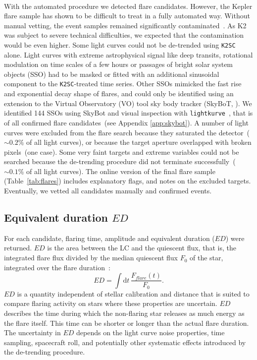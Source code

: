 \documentclass{aa}
\begin{document}
\\
With the automated procedure we detected flare candidates. However, the Kepler flare sample has shown to be difficult to treat in a fully automated way. Without manual vetting, the event samples remained significantly contaminated~\citep{yang2019}. As K2 was subject to severe technical difficulties, we expected that the contamination would be even higher. Some light curves could not be de-trended using \texttt{K2SC} alone. Light curves with extreme astrophysical signal like deep transits, rotational modulation on time scales of a few hours or passages of bright solar system objects (SSO) had to be masked or fitted with an additional sinusoidal component to the \texttt{K2SC}-treated time series. Other SSOs mimicked the fast rise and exponential decay shape of flares, and could only be identified using an extension to the Virtual Observatory (VO) tool sky body tracker (SkyBoT, \citealt{berthier2006, berthier2016}). We identified 144 SSOs using SkyBot and visual inspection with \texttt{lightkurve}~\citep{lightkurve2018}, that is of all confirmed flare candidates~(see Appendix \ref{app:skybot}). A number of light curves were excluded from the flare search because they saturated the detector~($\sim 0.2\%$ of all light curves), or because the target aperture overlapped with broken pixels~(one case). Some very faint targets and extreme variables could not be searched because the de-trending procedure did not terminate successfully~($\sim 0.1\%$ of all light curves). The online version of the final flare sample (Table~\ref{tab:flares}) includes explanatory flags, and notes on the excluded targets. Eventually, we vetted all candidates manually and confirmed events.
\subsection{Equivalent duration $ED$}
\label{sec:ed}
For each candidate, flaring time, amplitude and equivalent duration ($ED$) were returned.
$ED$ is the area between the LC and the quiescent flux, that is, the integrated flare flux divided by the median quiescent flux $F_0$ of the star, integrated over the flare duration~\citep{gershberg1972}:
\begin{equation}
\label{eq:ED}
ED=\displaystyle \int \mathrm dt\, \frac{F_{flare}(t)}{F_0}.
\end{equation}
$ED$ is a quantity independent of stellar calibration and distance that is suited to compare flaring activity on stars where these properties are uncertain. $ED$ describes the time during which the non-flaring star releases as much energy as the flare itself. This time can be shorter or longer than the actual flare duration. The uncertainty in $ED$ depends on the light curve noise properties, time sampling, spacecraft roll, and potentially other systematic effects introduced by the de-trending procedure. 
\end{document}
